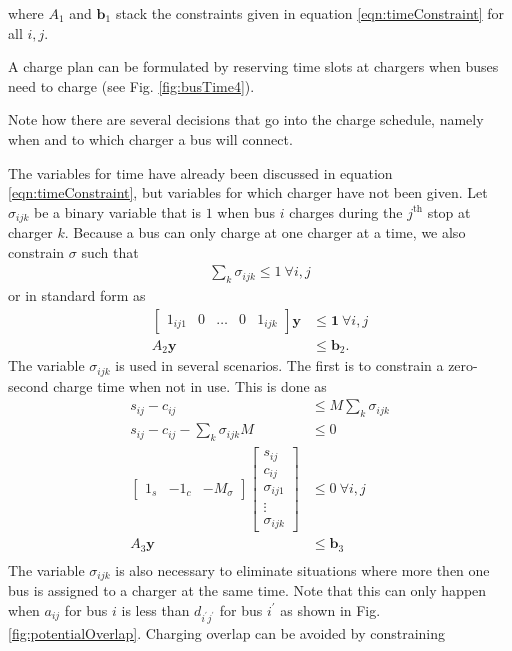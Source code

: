 	where $A_1$ and $\mathbf{b}_1$ stack the constraints given in equation \ref{eqn:timeConstraint} for all $i,j$.
\par A charge plan can be formulated by reserving time slots at chargers when buses need to charge (see Fig. \ref{fig:busTime4}).

	Note how there are several decisions that go into the charge schedule, namely when and to which charger a bus will connect. 
\par The variables for time have already been discussed in equation \ref{eqn:timeConstraint}, but variables for which charger have not been given.  Let $\sigma_{ijk}$ be a binary variable that is $1$ when bus $i$ charges during the $j^{\text{th}}$ stop at charger $k$. Because a bus can only charge at one charger at a time, we also constrain $\sigma$ such that
\begin{equation}
	\begin{aligned}
		\sum_k \sigma_{ijk} \le 1 \ \forall i,j
	\end{aligned}
\end{equation} 
or in standard form as 
\begin{equation} \begin{aligned}
	\begin{bmatrix}1_{ij1} & 0 & \hdots & 0 & 1_{ijk} \end{bmatrix} \mathbf{y} &\le \mathbf{1} \ \forall i,j\\
		A_2\mathbf{y} & \le \mathbf{b}_2.
\end{aligned} \end{equation}
	The variable $\sigma_{ijk}$ is used in several scenarios. The first is to constrain a zero-second charge time when not in use.  This is done as
	\begin{equation}\begin{aligned}
		s_{ij} - c_{ij} &\le M\sum_{k}\sigma_{ijk} \\
		s_{ij} - c_{ij} - \sum_{k}\sigma_{ijk}M &\le 0\\
		\begin{bmatrix} 1_s & -1_c & -M_{\sigma} \end{bmatrix}\begin{bmatrix}s_{ij} \\ c_{ij} \\ \sigma_{ij1} \\ \vdots \\ \sigma_{ijk} \end{bmatrix} &\le 0 \ \forall i,j \\
			A_3\mathbf{y} &\le \mathbf{b}_3 \\
	\end{aligned} \end{equation}
The variable $\sigma_{ijk}$ is also necessary to eliminate situations where more then one bus is assigned to a charger at the same time. Note that this can only happen when $a_{ij}$ for bus $i$ is less than $d_{i^{'}j^{'}}$ for bus $i^{'}$ as shown in Fig. \ref{fig:potentialOverlap}. Charging overlap can be avoided by constraining


